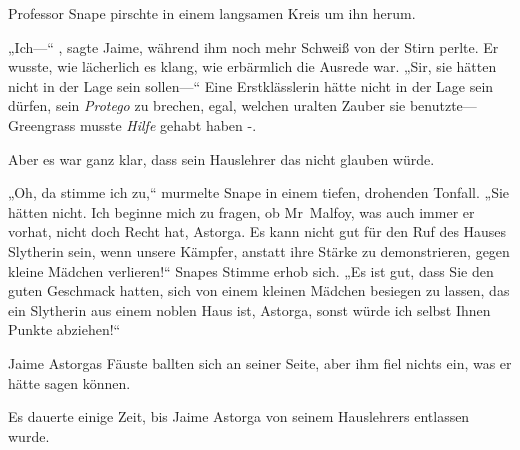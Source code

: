 Professor Snape pirschte in einem langsamen Kreis um ihn herum.

„Ich—“ , sagte Jaime, während ihm noch mehr Schweiß von der Stirn perlte. Er wusste, wie lächerlich es klang, wie erbärmlich die Ausrede war. „Sir, sie hätten nicht in der Lage sein sollen—“ Eine Erstklässlerin hätte nicht in der Lage sein dürfen, sein \emph{Protego} zu brechen, egal, welchen uralten Zauber sie benutzte—Greengrass musste \emph{Hilfe} gehabt haben -.

Aber es war ganz klar, dass sein Hauslehrer das nicht glauben würde.

„Oh, da stimme ich zu,“ murmelte Snape in einem tiefen, drohenden Tonfall. „Sie hätten nicht. Ich beginne mich zu fragen, ob Mr~Malfoy, was auch immer er vorhat, nicht doch Recht hat, Astorga. Es kann nicht gut für den Ruf des Hauses Slytherin sein, wenn unsere Kämpfer, anstatt ihre Stärke zu demonstrieren, gegen kleine Mädchen verlieren!“ Snapes Stimme erhob sich. „Es ist gut, dass Sie den guten Geschmack hatten, sich von einem kleinen Mädchen besiegen zu lassen, das ein Slytherin aus einem noblen Haus ist, Astorga, sonst würde ich selbst Ihnen Punkte abziehen!“

Jaime Astorgas Fäuste ballten sich an seiner Seite, aber ihm fiel nichts ein, was er hätte sagen können.

Es dauerte einige Zeit, bis Jaime Astorga von seinem Hauslehrers entlassen wurde.

